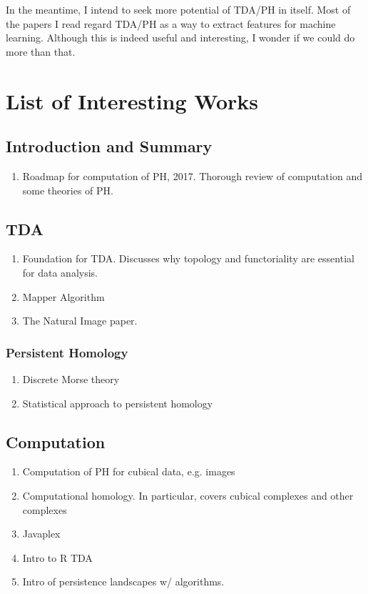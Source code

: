 \documentclass[10pt,a4paper]{article}
\begin{document}
In the meantime, I intend to seek more potential of TDA/PH in itself. Most of the papers I read regard TDA/PH as a way to extract features for machine learning. Although this is indeed useful and interesting, I wonder if we could do more than that.

\section{List of Interesting Works}
\subsection{Introduction and Summary}
\begin{enumerate}
	\item \cite{Otter2017} Roadmap for computation of PH, 2017. Thorough review of computation and some theories of PH.
\end{enumerate}
\subsection{TDA}
\begin{enumerate}
	\item \cite{Carlsson2009} Foundation for TDA. Discusses why topology and functoriality are essential for data analysis.
	\item \cite{Singh2007} Mapper Algorithm
	\item \cite{Carlsson2008} The Natural Image paper.
\end{enumerate}
\subsubsection{Persistent Homology}
\begin{enumerate}
	\item \cite{Mischaikow2013} Discrete Morse theory
	\item \cite{Bubenik2007} Statistical approach to persistent homology
\end{enumerate}
\subsection{Computation}
\begin{enumerate}
	\item \cite{Wagner2012} Computation of PH for cubical data, e.g. images
	\item \cite{Kaczynski2004} Computational homology. In particular, covers cubical complexes and other complexes
	\item \cite{Javaplex} Javaplex
	\item \cite{Fasy2014} Intro to R TDA
	\item \cite{Bubenik2017} Intro of persistence landscapes w/ algorithms.
\end{enumerate}

\newpage


\end{document}
